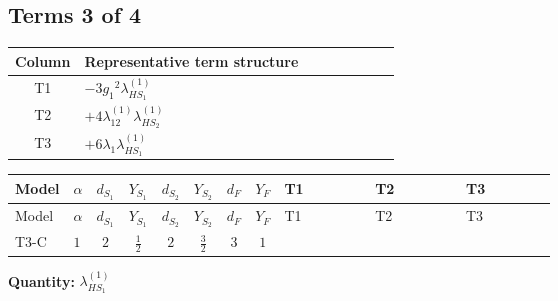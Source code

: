 \documentclass[8pt]{article}
\begin{document}
\begin{landscape}
\subsection*{Terms 3 of 4}
\begin{center}
\begin{tabular}{@{}c >{\raggedright\arraybackslash}p{0.82\linewidth}@{}}
\toprule
Column & Representative term structure \\
\midrule
T1 & \(\displaystyle -3 {g_1}^2 {\lambda_{HS_1}^{(1)}}\) \\
\midrule
T2 & \(\displaystyle +4 {\lambda_{12}^{(1)}} {\lambda_{HS_2}^{(1)}}\) \\
\midrule
T3 & \(\displaystyle +6 {\lambda_1} {\lambda_{HS_1}^{(1)}}\) \\
\midrule
\bottomrule
\end{tabular}
\end{center}
\smallskip
\tiny
\begin{longtable}{@{}llcccccc >{\raggedright\arraybackslash}p{0.21\linewidth} >{\raggedright\arraybackslash}p{0.21\linewidth} >{\raggedright\arraybackslash}p{0.21\linewidth}@{}}
\toprule
Model & $\alpha$ & $d_{S_1}$ & $Y_{S_1}$ & $d_{S_2}$ & $Y_{S_2}$ & $d_F$ & $Y_F$ & T1 & T2 & T3 \\
\midrule
\endfirsthead
\toprule
Model & $\alpha$ & $d_{S_1}$ & $Y_{S_1}$ & $d_{S_2}$ & $Y_{S_2}$ & $d_F$ & $Y_F$ & T1 & T2 & T3 \\
\midrule
\endhead
T3-C & $1$ & $2$ & $\frac{1}{2}$ & $2$ & $\frac{3}{2}$ & $3$ & $1$ & \scriptsize\adjustbox{max width=\linewidth}{$\begin{gathered} -3 {g_1}^2 {\lambda_{HS_1}^{(1)}}\end{gathered}$} & \scriptsize\adjustbox{max width=\linewidth}{$\begin{gathered} +4 {\lambda_{12}^{(1)}} {\lambda_{HS_2}^{(1)}}\end{gathered}$} & \scriptsize\adjustbox{max width=\linewidth}{$\begin{gathered} +6 {\lambda_1} {\lambda_{HS_1}^{(1)}}\end{gathered}$} \\
\midrule
\bottomrule
\end{longtable}
\clearpage
\noindent\textbf{Quantity: }$\lambda_{HS_1}^{(1)}$\par\smallskip

\end{landscape}
\end{document}
